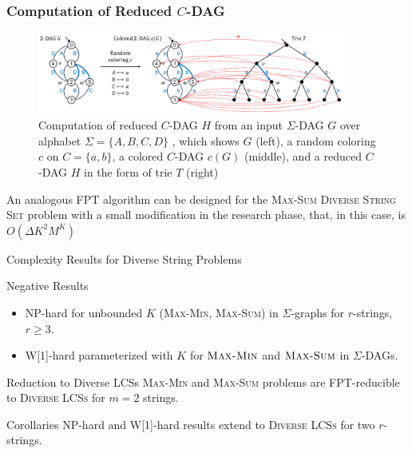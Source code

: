 \documentclass{beamer}
\begin{document}
\begin{frame}
    \frametitle{Computation of Reduced $C$-DAG}
    \begin{figure}[t]
        \baselineskip
        \centering
        \vspace{-0.5\baselineskip}
        \includegraphics[width=0.9\textwidth,angle=0]{./figfptalgo}
        \caption{Computation of reduced $C$-DAG $H$ from an input $\Sigma$-DAG $G$ over alphabet $\Sigma = \{A, B, C, D\}$ , which shows $G$  (left), a random coloring $c$ on $C = \{a,b\}$, a colored $C$-DAG $c(G)$ (middle), and a reduced $C$-DAG $H$ in the form of trie $T$ (right)}\label{fig:fptalgo}
      \end{figure}

      \begin{block}{}
        An analogous FPT algorithm can be designed for the \textsc{Max-Sum Diverse String Set} problem with a small modification in the research phase, that, in this case, is  $O(\Delta K^2 M^K)$
      \end{block}

\end{frame}

\begin{frame}{Complexity Results for Diverse String Problems}
    \begin{block}{Negative Results}
        \begin{itemize}
            \item NP-hard for unbounded $K$ (\textsc{Max-Min}, \textsc{Max-Sum}) in $\Sigma$-graphs for $r$-strings, $r \ge 3$.
            \item W[1]-hard parameterized with $K$ for $\textsc{Max-Min}$ and $\textsc{Max-Sum}$ in $\Sigma$-DAGs.
        \end{itemize}
    \end{block}

    \begin{block}{Reduction to Diverse LCSs}
        \textsc{Max-Min} and \textsc{Max-Sum} problems are FPT-reducible to \textsc{Diverse LCSs} for $m=2$ strings.
    \end{block}

    \begin{block}{Corollaries}
        NP-hard and W[1]-hard results extend to \textsc{Diverse LCSs} for two $r$-strings.
    \end{block}
\end{frame}
\end{document}
